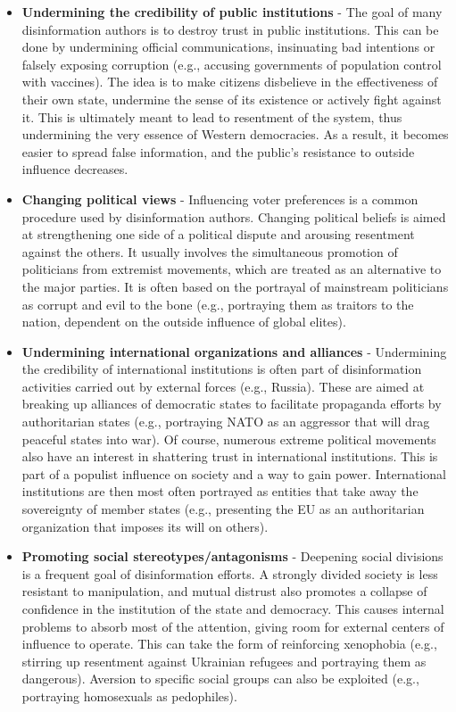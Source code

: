 \documentclass[11pt]{article}
\begin{document}
\begin{itemize}[nosep, leftmargin=*]
    \item \textbf{Undermining the credibility of public institutions} - The goal of many disinformation authors is to destroy trust in public institutions. This can be done by undermining official communications, insinuating bad intentions or falsely exposing corruption (e.g., accusing governments of population control with vaccines). The idea is to make citizens disbelieve in the effectiveness of their own state, undermine the sense of its existence or actively fight against it. This is ultimately meant to lead to resentment of the system, thus undermining the very essence of Western democracies. As a result, it becomes easier to spread false information, and the public's resistance to outside influence decreases.
    \item \textbf{Changing political views} - Influencing voter preferences is a common procedure used by disinformation authors. Changing political beliefs is aimed at strengthening one side of a political dispute and arousing resentment against the others. It usually involves the simultaneous promotion of politicians from extremist movements, which are treated as an alternative to the major parties. It is often based on the portrayal of mainstream politicians as corrupt and evil to the bone (e.g., portraying them as traitors to the nation, dependent on the outside influence of global elites).
    \item \textbf{Undermining international organizations and alliances} - Undermining the credibility of international institutions is often part of disinformation activities carried out by external forces (e.g., Russia). These are aimed at breaking up alliances of democratic states to facilitate propaganda efforts by authoritarian states (e.g., portraying NATO as an aggressor that will drag peaceful states into war). Of course, numerous extreme political movements also have an interest in shattering trust in international institutions. This is part of a populist influence on society and a way to gain power. International institutions are then most often portrayed as entities that take away the sovereignty of member states (e.g., presenting the EU as an authoritarian organization that imposes its will on others).
    \item \textbf{Promoting social stereotypes/antagonisms} - Deepening social divisions is a frequent goal of disinformation efforts. A strongly divided society is less resistant to manipulation, and mutual distrust also promotes a collapse of confidence in the institution of the state and democracy. This causes internal problems to absorb most of the attention, giving room for external centers of influence to operate. This can take the form of reinforcing xenophobia (e.g., stirring up resentment against Ukrainian refugees and portraying them as dangerous). Aversion to specific social groups can also be exploited (e.g., portraying homosexuals as pedophiles).

\end{itemize}
\end{document}
